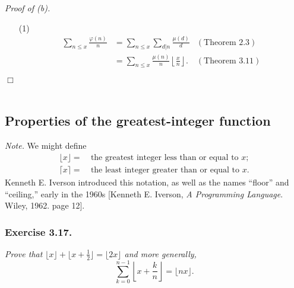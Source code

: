 \documentclass{article}
\begin{document}
\emph{Proof of (b).}
\begin{enumerate}
\item[(1)]
  \begin{align*}
    \sum_{n \leq x} \frac{\varphi(n)}{n}
    &= \sum_{n \leq x} \sum_{d|n} \frac{\mu(d)}{d}
      &(\text{Theorem 2.3}) \\
    &= \sum_{n \leq x} \frac{\mu(n)}{n} \left\lfloor\frac{x}{n}\right\rfloor.
      &(\text{Theorem 3.11})
  \end{align*}
\end{enumerate}
$\Box$ \\\\






\subsection*{Properties of the greatest-integer function \\}



\emph{Note.}
We might define
\begin{align*}
  \lfloor x \rfloor = &\: \text{the greatest integer less than or equal to $x$}; \\
  \lceil x \rceil = &\: \text{the least integer greater than or equal to $x$}.
\end{align*}
Kenneth E. Iverson introduced this notation, as well as the names ``floor'' and ``ceiling,''
early in the 1960s [Kenneth E. Iverson, \emph{A Programming Language}. Wiley, 1962. page 12]. \\






\subsubsection*{Exercise 3.17.}
\emph{Prove that $\lfloor x \rfloor + \lfloor x+\frac{1}{2} \rfloor = \lfloor 2x \rfloor$
and more generally,}
\[
  \sum_{k=0}^{n-1} \left\lfloor x + \frac{k}{n} \right\rfloor
  = \lfloor nx \rfloor.
\]
\end{document}
